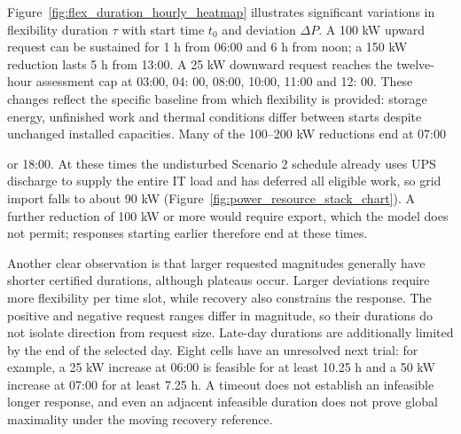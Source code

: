 \documentclass[lettersize,journal]{IEEEtran}
\providecommand{\DIFadd}[1]{{\color{blue}#1}}
\providecommand{\DIFaddbegin}{}
\providecommand{\DIFaddend}{}
\begin{document}
Figure~\ref{fig:flex_duration_hourly_heatmap} illustrates significant variations in flexibility duration $\tau$ with start time $t_0$ and deviation $\Delta P$.  \DIFaddbegin \DIFadd{A 100 kW upward request can be sustained for 1 h from 06}\DIFaddend :00  \DIFaddbegin \DIFadd{and 6 h from noon; a 150 kW reduction lasts 5 h from 13}\DIFaddend :\DIFaddbegin \DIFadd{00. A 25 kW downward request reaches the twelve-hour assessment cap at 03:00, 04:}\DIFaddend{} 00\DIFaddbegin \DIFadd{, 08:00, 10:00, 11:00 and 12:}\DIFaddend{} 00.  \DIFaddbegin \DIFadd{These changes reflect the specific baseline from which flexibility is provided: storage energy, unfinished work and thermal conditions differ between starts despite unchanged installed capacities. Many of the 100--200 kW reductions end at 07}\DIFaddend :00  \DIFaddbegin \DIFadd{or 18:00. At these times the undisturbed Scenario 2 schedule already uses UPS discharge to supply the entire IT load and has deferred all eligible work, so grid import falls to about 90 kW (Figure~\ref{fig:power_resource_stack_chart}). A further reduction of 100 kW or more would require export, which the model does not permit; responses starting earlier therefore end at these times.

}

\DIFaddend Another clear observation is that  \DIFaddbegin \DIFadd{larger requested magnitudes generally have shorter certified durations, although plateaus occur. Larger deviations require more flexibility per time slot, while recovery also constrains the response. The positive and negative request ranges differ in magnitude, so their durations do not isolate direction from request size. Late-day durations are additionally limited by the end of the selected day. Eight cells have an unresolved next trial: for example, a 25 kW increase at 06:00 is feasible for at least 10.25 h and a 50 kW increase at 07:00 for at least 7.25 h. A timeout does not establish an infeasible longer response, and even an adjacent infeasible duration does not prove global maximality under the moving recovery reference}\DIFaddend .
\end{document}
